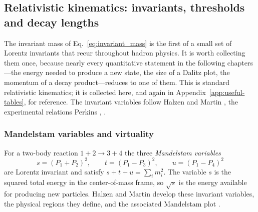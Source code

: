 \FloatBarrier

\subsection{Relativistic kinematics: invariants, thresholds and decay lengths}
\label{subsec:rel-kinematics}

The invariant mass of Eq.~\eqref{eq:invariant_mass} is the first of a small set of
Lorentz invariants that recur throughout hadron physics. It is worth collecting them
once, because nearly every quantitative statement in the following chapters---the
energy needed to produce a new state, the size of a Dalitz plot, the momentum of a
decay product---reduces to one of them. This is standard relativistic kinematics; it is
collected here, and again in Appendix~\ref{app:useful-tables}, for reference. The
invariant variables follow Halzen and Martin \cite[Ch.~4]{HalzenMartin1984}, the
experimental relations Perkins \cite[Ch.~2]{Perkins2000}, \cite[Ch.~11]{Perkins2000}.

\subsubsection{Mandelstam variables and virtuality}
\label{subsubsec:mandelstam}

For a two-body reaction $1 + 2 \to 3 + 4$ the three \emph{Mandelstam variables}
\begin{equation}
    s = (P_1 + P_2)^2, \qquad
    t = (P_1 - P_3)^2, \qquad
    u = (P_1 - P_4)^2
    \label{eq:mandelstam}
\end{equation}
are Lorentz invariant and satisfy $s + t + u = \sum_i m_i^2$. The variable $s$ is the
squared total energy in the center-of-mass frame, so $\sqrt{s}$ is the energy available
for producing new particles. Halzen and Martin develop these invariant variables, the
physical regions they define, and the associated Mandelstam plot
\cite[Ch.~4]{HalzenMartin1984}.

